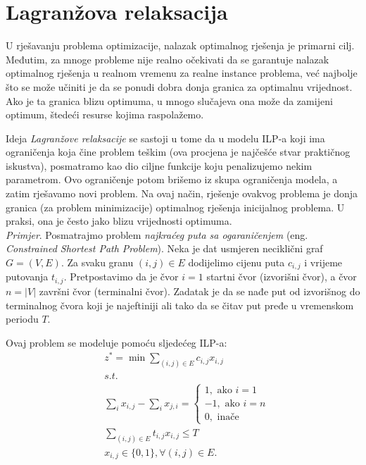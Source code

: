\documentclass[a4paper, utf8, 11pt, colorlinks]{book}
\begin{document}
\section{Lagranžova relaksacija}
U rješavanju problema optimizacije, nalazak optimalnog rješenja je primarni cilj. Međutim, za mnoge probleme nije realno očekivati da se garantuje nalazak optimalnog rješenja u realnom vremenu za realne instance problema, već najbolje što se može učiniti  je da se ponudi dobra donja granica za optimalnu vrijednost. Ako je ta granica blizu optimuma, u mnogo slučajeva ona može da zamijeni optimum, štedeći resurse kojima raspolažemo. 

Ideja \emph{Lagranžove relaksacije} se sastoji u tome da u modelu ILP-a  koji ima  ograničenja koja čine problem teškim (ova procjena je najčešće stvar praktičnog iskustva),  posmatramo kao dio ciljne funkcije koju penalizujemo nekim parametrom.  %
Ovo ograničenje potom brišemo iz skupa ograničenja modela, a zatim rješavamo novi problem. Na ovaj način, rješenje ovakvog problema je donja granica (za problem minimizacije)  optimalnog rješenja inicijalnog problema. U praksi, ona je često jako blizu vrijednosti optimuma. \\

\emph{Primjer}. Posmatrajmo problem \emph{najkraćeg puta sa ogaraničenjem} (eng. \emph{Constrained Shortest Path Problem}). Neka je dat usmjeren neciklični graf $G=(V,E)$. Za svaku granu $(i,j) \in E$ dodijelimo cijenu puta $c_{i,j}$ i vrijeme putovanja $t_{i,j}$. Pretpostavimo da je čvor $i=1$ startni čvor (izvorišni čvor), a čvor $n = |V|$   završni čvor (terminalni čvor). Zadatak je da se nađe put  od izvorišnog do terminalnog čvora koji je najeftiniji ali tako da se čitav put pređe u vremenskom periodu $T$.

Ovaj problem se modeluje pomoću sljedećeg ILP-a:
 \begin{align}
    &z^*=\min\sum_{(i,j) \in E }c_{i,j}x_{i,j} \\
    &{s.t. }\\
    & \sum_{i} x_{i,j} - \sum_{i} x_{j,i} = \begin{cases}  
                                               1, \mbox{ ako } i=1 \\
                                              -1, \mbox{ ako } i=n \\
                                               0, \mbox{ inače }
                                            \end{cases} \\
    & \sum_{(i,j) \in E} t_{i,j} x_{i,j} \leq T \\
    & x_{i,j} \in \{0, 1 \}, \forall (i,j) \in E.
\end{align} 
\end{document}
